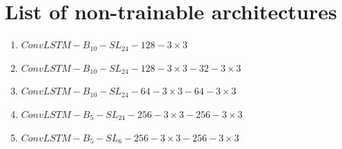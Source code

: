 \cleardoublepage
\chapter{List of non-trainable architectures} \label{app:list_non_trainable_architectures}
\begin{enumerate}
    \item $ConvLSTM-B_{10}-SL_{24}-128-3\times3$
    \item $ConvLSTM-B_{10}-SL_{24}-128-3\times3-32-3\times3$
    \item $ConvLSTM-B_{10}-SL_{24}-64-3\times3-64-3\times3$
    \item $ConvLSTM-B_{5}-SL_{24}-256-3\times3-256-3\times3$
    \item $ConvLSTM-B_{5}-SL_{6}-256-3\times3-256-3\times3$
\end{enumerate}

\cleardoublepage
